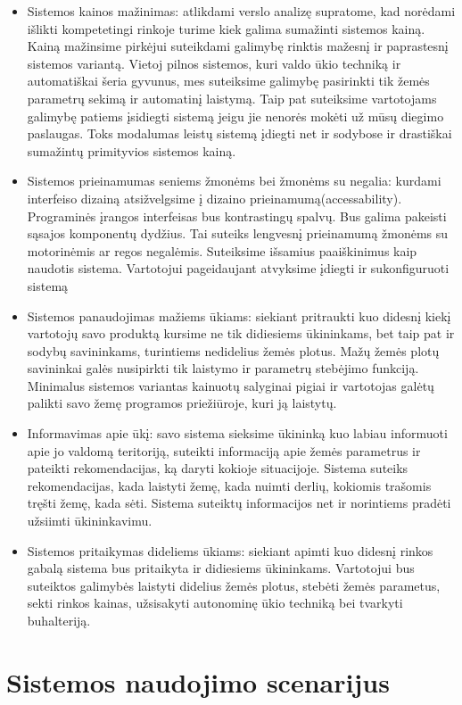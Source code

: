 \documentclass[oneside]{VUMIFPSkursinis}
\begin{document}
	\begin{itemize}
		\item{Sistemos kainos mažinimas: atlikdami verslo analizę supratome, kad norėdami išlikti kompetetingi rinkoje turime kiek galima sumažinti sistemos kainą. Kainą mažinsime pirkėjui suteikdami galimybę rinktis mažesnį ir paprastesnį sistemos variantą.  Vietoj pilnos sistemos, kuri valdo ūkio techniką ir automatiškai šeria gyvunus, mes suteiksime galimybę pasirinkti tik žemės parametrų sekimą ir automatinį laistymą. Taip pat suteiksime vartotojams galimybę patiems įsidiegti sistemą jeigu jie nenorės mokėti už mūsų diegimo paslaugas. Toks modalumas leistų sistemą įdiegti net ir sodybose ir drastiškai sumažintų primityvios sistemos kainą.}
		\item{Sistemos prieinamumas seniems žmonėms bei žmonėms su negalia: kurdami interfeiso dizainą atsižvelgsime į dizaino prieinamumą(accessability). Programinės įrangos interfeisas bus kontrastingų spalvų. Bus galima pakeisti sąsajos komponentų dydžius. Tai suteiks lengvesnį prieinamumą žmonėms su motorinėmis ar regos negalėmis. Suteiksime išsamius paaiškinimus kaip naudotis sistema. Vartotojui pageidaujant atvyksime įdiegti ir sukonfiguruoti sistemą}
		\item{Sistemos panaudojimas mažiems ūkiams: siekiant pritraukti kuo didesnį kiekį vartotojų savo produktą kursime ne tik didiesiems ūkininkams, bet taip pat ir sodybų savininkams, turintiems nedidelius žemės plotus. Mažų žemės plotų savininkai galės nusipirkti tik laistymo ir parametrų stebėjimo funkciją. Minimalus sistemos variantas kainuotų salyginai pigiai ir vartotojas galėtų palikti savo žemę programos priežiūroje, kuri ją laistytų.}
		\item{Informavimas apie ūkį: savo sistema sieksime ūkininką kuo labiau informuoti apie jo valdomą teritoriją, suteikti informaciją apie žemės parametrus ir pateikti rekomendacijas, ką daryti kokioje situacijoje. Sistema suteiks rekomendacijas, kada laistyti žemę, kada nuimti derlių, kokiomis trašomis tręšti žemę, kada sėti. Sistema suteiktų informacijos net ir norintiems pradėti užsiimti ūkininkavimu.}
		\item{Sistemos pritaikymas dideliems ūkiams: siekiant apimti kuo didesnį rinkos gabalą sistema bus pritaikyta ir didiesiems ūkininkams. Vartotojui bus suteiktos galimybės laistyti didelius žemės plotus, stebėti žemės parametus, sekti rinkos kainas, užsisakyti autonominę ūkio techniką bei tvarkyti buhalteriją.}
	\end{itemize}
\section{Sistemos naudojimo scenarijus}
\end{document}

